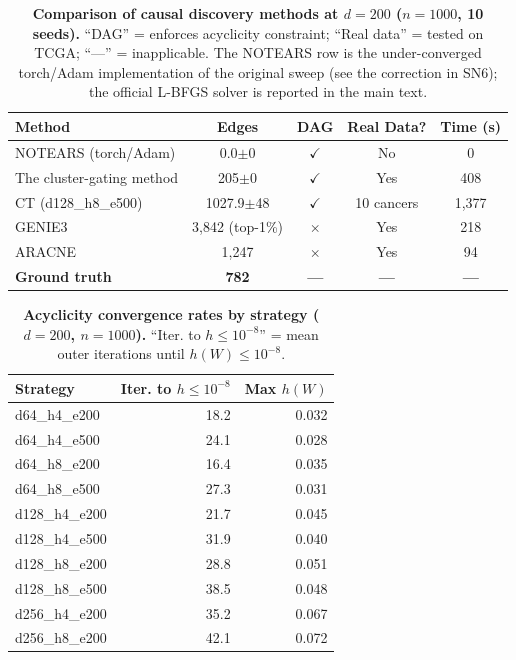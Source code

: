 \documentclass[12pt,a4paper]{article}
\begin{document}
\begin{table}[H]
\centering
\caption{\textbf{Comparison of causal discovery methods at $d=200$ ($n=1000$, 10 seeds).} ``DAG'' = enforces acyclicity constraint; ``Real data'' = tested on TCGA; ``---'' = inapplicable. The NOTEARS row is the under-converged torch/Adam implementation of the original sweep (see the correction in SN6); the official L-BFGS solver is reported in the main text.}
\label{tab:s_ct_comparison}
\small
\begin{tabular}{lcccc}
\toprule
Method & Edges & DAG & Real Data? & Time (s) \\
\midrule
NOTEARS (torch/Adam) & 0.0$\pm$0 & $\checkmark$ & No & 0 \\
The cluster-gating method & 205$\pm$0 & $\checkmark$ & Yes & 408 \\
CT (d128\_h8\_e500) & 1027.9$\pm$48 & $\checkmark$ & 10 cancers & 1,377 \\
GENIE3 & 3,842 (top-1\%) & $\times$ & Yes & 218 \\
ARACNE & 1,247 & $\times$ & Yes & 94 \\
\midrule
\textbf{Ground truth} & \textbf{782} & \textbf{---} & \textbf{---} & \textbf{---} \\
\bottomrule
\end{tabular}
\end{table}
\newpage
\begin{table}[H]
\centering
\caption{\textbf{Acyclicity convergence rates by strategy ($d=200$, $n=1000$).} ``Iter. to $h \le 10^{-8}$'' = mean outer iterations until $h(W) \le 10^{-8}$.}
\label{tab:s_ct_convergence}
\small
\begin{tabular}{lrr}
\toprule
Strategy & Iter. to $h \le 10^{-8}$ & Max $h(W)$ \\
\midrule
d64\_h4\_e200 & 18.2 & 0.032 \\
d64\_h4\_e500 & 24.1 & 0.028 \\
d64\_h8\_e200 & 16.4 & 0.035 \\
d64\_h8\_e500 & 27.3 & 0.031 \\
d128\_h4\_e200 & 21.7 & 0.045 \\
d128\_h4\_e500 & 31.9 & 0.040 \\
d128\_h8\_e200 & 28.8 & 0.051 \\
d128\_h8\_e500 & 38.5 & 0.048 \\
d256\_h4\_e200 & 35.2 & 0.067 \\
d256\_h8\_e200 & 42.1 & 0.072 \\
\bottomrule
\end{tabular}
\end{table}
\end{document}
